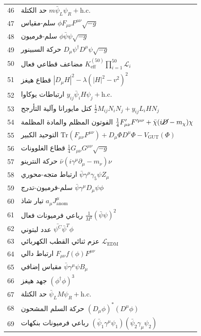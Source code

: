 \documentclass[11pt,a4paper]{article}
\begin{document}
\begin{longtable}{r l}
		46 & حد الكتلة \(m\bar{\psi}_L\psi_R + \text{h.c.}\) \\
		47 & سلم-مقياس \(\phi F_{\mu\nu}F^{\mu\nu}\sqrt{-g}\) \\
		48 & سلم-فرميون \(\phi\bar{\psi}\psi\sqrt{-g}\) \\
		49 & حركة السبينور \(D_\mu\psi^\dagger D^\mu\psi\sqrt{-g}\) \\
		50 & مضاعف قطاعي فعال \(K^{(50)}_{\mathrm{eff}}\prod_{i=1}^{50}\mathcal{L}_i\) \\
		51 & قطاع هيغز \(|D_\mu H|^2 - \lambda(|H|^2 - v^2)^2\) \\
		52 & ارتباطات يوكاوا \(y_{ij}\bar{\psi}_i H\psi_j + \text{h.c.}\) \\
		53 & كتل مايورانا وآلية التأرجح \(\frac{1}{2}M_{ij}N_i N_j + y_{ij}L_i H N_j\) \\
		54 & الفوتون المظلم والمادة المظلمة \(\frac{1}{4}F'_{\mu\nu}F'^{\mu\nu} + \bar{\chi}(i\cancel{D} - m_\chi)\chi\) \\
		55 & التوحيد الكبير \(\mathrm{Tr}(F_{\mu\nu}F^{\mu\nu}) + D_\mu\Phi D^\mu\Phi - V_{\text{GUT}}(\Phi)\) \\
		56 & قطاع الغلوونات \(\frac{1}{4}G_{\mu\nu}G^{\mu\nu}\sqrt{-g}\) \\
		57 & حركة النترينو \(\bar{\nu}(i\gamma^\mu\partial_\mu - m_\nu)\nu\) \\
		58 & ارتباط متجه-محوري \(\bar{\psi}\gamma^\mu\gamma_5\psi Z_\mu\) \\
		59 & سلم-فرميون-تدرج \(\bar{\psi}\gamma^\mu D_\mu\psi\phi\) \\
		60 & تيار شاذ \(a_\mu J^\mu_{\text{anom}}\) \\
		61 & رباعي فرميونات فعال \(\frac{1}{M^2}(\bar{\psi}\psi)^2\) \\
		62 & عدد لبتوني \(\bar{\psi^C}\bar{\psi}^T\phi\) \\
		63 & عزم ثنائي القطب الكهربائي \(\mathcal{L}_{\text{EDM}}\) \\
		64 & ارتباط دالي \(F_{\mu\nu}f(\phi)F^{\mu\nu}\) \\
		65 & مقياس إضافي \(\bar{\psi}\gamma^\mu\psi B_\mu\) \\
		66 & جهد هيغز \((\phi^\dagger\phi)^3\) \\
		67 & حد الكتلة \(\bar{\psi}_L M \psi_R + \text{h.c.}\) \\
		68 & حركة السلم المشحون \((D_\mu\phi)^*(D^\mu\phi)\) \\
		69 & رباعي فرميونات بنكهات \((\bar{\psi}_1\gamma^\mu\psi_1)(\bar{\psi}_2\gamma_\mu\psi_2)\) \\

\end{longtable}
\end{document}
